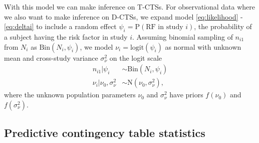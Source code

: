 \documentclass[AMA,STIX1COL]{WileyNJD-v2}
\newcommand{\RF}{\mbox{RF}}
\begin{document}
With this model we can make inference on T-CTSs. For observational data where we also want to make inference on D-CTSs, we expand model \eqref{eq:likelihood} - \eqref{eq:deltai} to include a random effect $\psi_i = \mbox{P}(\RF \text{ in study } i)$, the probability of a subject having the risk factor in study $i$. Assuming binomial sampling of $n_{i1}$ from $N_i$ as $\mbox{Bin}(N_i, \psi_i)$, we model $\nu_i = \mbox{logit}(\psi_i)$ as normal with unknown mean and cross-study variance $\sigma^2_{\nu}$ on the logit scale
\begin{align}
n_{i1} \vert \psi_i &\sim \mbox{Bin}(N_i, \psi_i) \label{eq:nij} \\
\nu_i \vert \nu_0, \sigma^2_\nu & \sim \mbox{N}(\nu_0, \sigma^2_\nu), \label{eq:nui}
\end{align}
\noindent where the unknown population parameters $\nu_0$ and $\sigma^2_\nu$ have priors $f(\nu_0)$ and $f(\sigma^2_{\nu})$. 

\subsection{Predictive contingency table statistics} \label{sec:CTSs}
\end{document}
